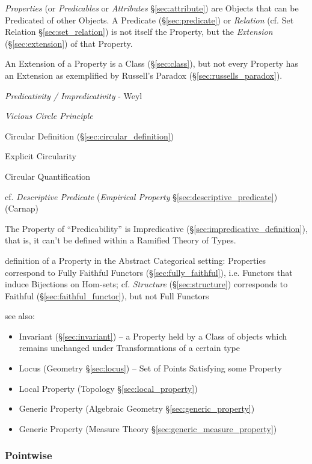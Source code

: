 \emph{Properties} (or \emph{Predicables} or \emph{Attributes}
\S\ref{sec:attribute}) are Objects that can be Predicated of other
Objects. A Predicate (\S\ref{sec:predicate}) or \emph{Relation} (cf.
Set Relation \S\ref{sec:set_relation}) is not itself the Property, but
the \emph{Extension} (\S\ref{sec:extension}) of that Property.

An Extension of a Property is a Class (\S\ref{sec:class}), but not
every Property has an Extension as exemplified by Russell's Paradox
(\S\ref{sec:russells_paradox}).

\emph{Predicativity / Impredicativity} - Weyl

\emph{Vicious Circle Principle}

Circular Definition (\S\ref{sec:circular_definition})

Explicit Circularity

Circular Quantification

cf. \emph{Descriptive Predicate} (\emph{Empirical Property}
\S\ref{sec:descriptive_predicate}) (Carnap)

The Property of ``Predicability'' is Impredicative
(\S\ref{sec:impredicative_definition}), that is, it can't be defined
within a Ramified Theory of Types.\cite{kleene52}

definition of a Property in the Abstract Categorical setting: Properties
correspond to Fully Faithful Functors (\S\ref{sec:fully_faithful}), i.e.
Functors that induce Bijections on Hom-sets; cf. \emph{Structure}
(\S\ref{sec:structure}) corresponds to Faithful (\S\ref{sec:faithful_functor}),
but not Full Functors

see also:
\begin{itemize}
  \item Invariant (\S\ref{sec:invariant}) -- a Property held by a Class of
    objects which remains unchanged under Transformations of a certain type
  \item Locus (Geometry \S\ref{sec:locus}) -- Set of Points Satisfying some
    Property
  \item Local Property (Topology \S\ref{sec:local_property})
  \item Generic Property (Algebraic Geometry \S\ref{sec:generic_property})
  \item Generic Property (Measure Theory \S\ref{sec:generic_measure_property})
\end{itemize}



\subsubsection{Pointwise}\label{sec:pointwise}
